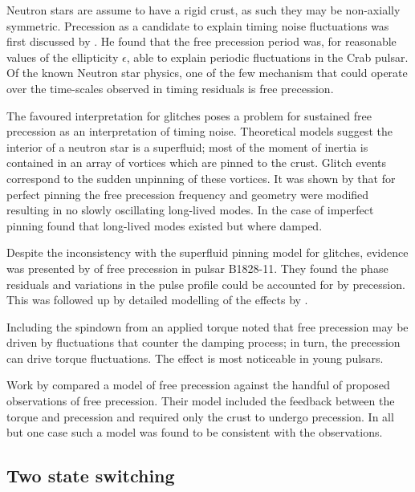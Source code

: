 Neutron stars are assume to have a rigid crust, as such they may be non-axially
symmetric. Precession as a candidate to explain timing noise fluctuations was
first discussed by \citet{Ruderman1970}. He found that the free precession
period was, for reasonable values of the  ellipticity $\epsilon$, able to
explain periodic fluctuations in the Crab pulsar. Of the known Neutron star 
physics, one of the few mechanism that could operate over the time-scales observed
in timing residuals is free precession. 

The favoured interpretation for glitches poses a problem for sustained free
precession as an interpretation of timing noise. Theoretical models suggest the
interior of a neutron star is a superfluid; most of the moment of inertia is
contained in an array of vortices which are pinned to the crust.  Glitch events
correspond to the sudden unpinning of these vortices. It was shown by
\citet{Shaham1977} that for perfect pinning the free precession frequency and
geometry were modified resulting in no slowly oscillating long-lived modes. In
the case of imperfect pinning \citet{Sedrakian1999} found that long-lived modes
existed but where damped.

Despite the inconsistency with the superfluid pinning model for glitches,
evidence was presented by \citet{Stairs2000} of free precession in pulsar
B1828-11. They found the phase residuals and variations in the pulse profile
could be accounted for by precession.  This was followed up by detailed
modelling of the effects by \citet{Akgun2006}.

Including the spindown from an applied torque \citet{Cordes1993} noted that
free precession may be driven by fluctuations that counter the damping process;
in turn, the precession can drive torque fluctuations. The effect is most
noticeable in young pulsars. 

Work by \citet{Jones2001} compared a model of free precession against the handful
of proposed observations of free precession. Their model included the feedback
between the torque and precession and required only the crust to undergo precession.
In all but one case such a model was found to be consistent with the observations.


\subsection{Two state switching}
\label{sec: two state switching}

